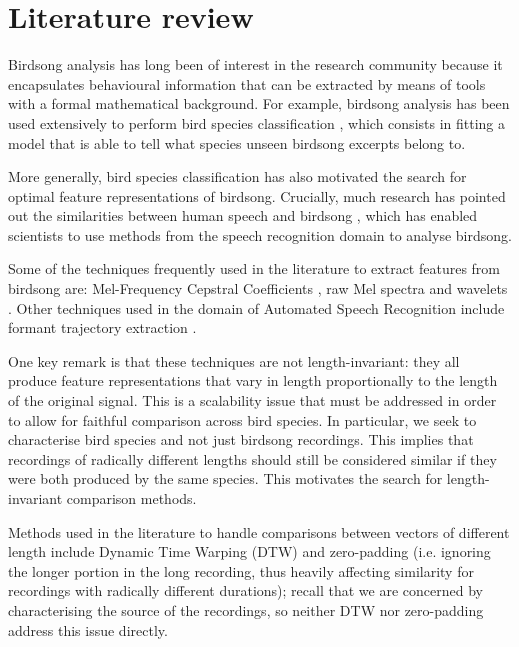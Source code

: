 \documentclass[pdftex,11pt,a4paper]{article}
\theoremstyle{definition}
\theoremstyle{remark}
\begin{document}
\section{Literature review}
\label{section_review}
Birdsong analysis has long been of interest in the research community because it encapsulates behavioural information that can be extracted by means of tools with a formal mathematical background. For example, birdsong analysis has been used extensively to perform bird species classification \cite{Chou2009,Wielgat2012,McIlraith1995,Lee2013,Franzen2003,Silla2013}, which consists in fitting a model that is able to tell what species unseen birdsong excerpts belong to.
\par More generally, bird species classification has also motivated the search for optimal feature representations of birdsong. Crucially, much research has pointed out the similarities between human speech and birdsong \cite{Snowdon2013,McIlraith1995}, which has enabled scientists to use methods from the speech recognition domain to analyse birdsong.
\par Some of the techniques frequently used in the literature to extract features from birdsong are: Mel-Frequency Cepstral Coefficients \cite{Silla2013,Wielgat2012,Stowell2014,Lopes2011}, raw Mel spectra \cite{Stowell2014} and wavelets \cite{Chou2009}. Other techniques used in the domain of Automated Speech Recognition include formant trajectory extraction \cite{Prica2010,Welling1998}.
\par One key remark is that these techniques are not length-invariant: they all produce feature representations that vary in length proportionally to the length of the original signal. This is a scalability issue that must be addressed in order to allow for faithful comparison across bird species. In particular, we seek to characterise bird species and not just birdsong recordings. This implies that recordings of radically different lengths should still be considered similar if they were both produced by the same species. This motivates the search for length-invariant comparison methods.
\par Methods used in the literature to handle comparisons between vectors of different length include Dynamic Time Warping (DTW) \cite{Jancovic2013,Muda2010} and zero-padding (i.e. ignoring the longer portion in the long recording, thus heavily affecting similarity for recordings with radically different durations); recall that we are concerned by characterising the source of the recordings, so neither DTW nor zero-padding address this issue directly. 
\end{document}
